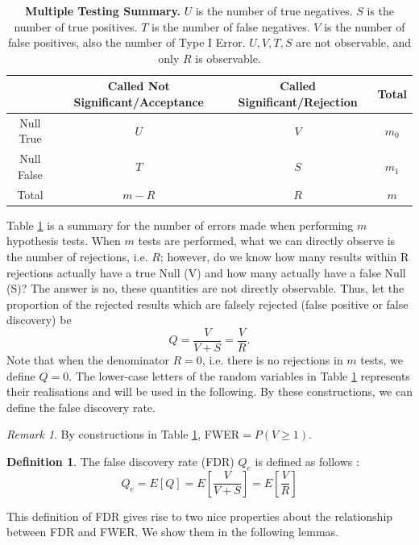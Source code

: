 \documentclass[12pt]{article}
\theoremstyle{plain}
\theoremstyle{definition}
\newtheorem{definition}{Definition}
\theoremstyle{remark}
\newtheorem*{remark}{Remark}
\begin{document}
\begin{table}[h]
    \centering
    \begin{tabular}{|c|c|c|c|}
    \hline
    & Called Not Significant/Acceptance & Called Significant/Rejection & Total \\
    \hline
    Null True & $U$ & $V$ & $m_0$\\
    \hline
    Null False & $T$ & $S$ & $m_1$\\
    \hline
    Total & $m-R$ & $R$ & $m$\\
    \hline
    \end{tabular}
    \caption{\textbf{Multiple Testing Summary.} $U$ is the number of true negatives. $S$ is the number of true positives. $T$ is the number of false negatives. $V$ is the number of false positives, also the number of Type I Error. $U,V,T,S$ are not observable, and only $R$ is observable.\cite{5.3}\cite{5.7}}
    \label{table 3}
\end{table}

Table \ref{table 3} is a summary for the number of errors made when performing $m$ hypothesis tests. When $m$ tests are performed, what we can directly observe is the number of rejections, i.e. $R$; however, do we know how many results within R rejections actually have a true Null (V) and how many actually have a false Null (S)? The answer is no, these quantities are not directly observable.\cite{5.3}\cite{5.7} Thus, let the proportion of the rejected results which are falsely rejected (false positive or false discovery) be $$Q=\frac{V}{V+S}=\frac{V}{R}.$$  Note that when the denominator $R=0$, i.e. there is no rejections in $m$ tests, we define $Q=0$. The lower-case letters of the random variables in Table \ref{table 3} represents their realisations and will be used in the following. By these constructions, we can define the false discovery rate.

\begin{remark}
By constructions in Table \ref{table 3}, FWER$=P(V\ge1)$.
\end{remark}

\begin{definition}
The false discovery rate (FDR) $Q_e$ is defined as follows \cite{5.7}:\[
Q_e=E[Q]=E\left[\frac{V}{V+S}\right]=E\left[\frac{V}{R}\right]
\]
\end{definition}

This definition of FDR gives rise to two nice properties about the relationship between FDR and FWER. We show them in the following lemmas.
\end{document}

